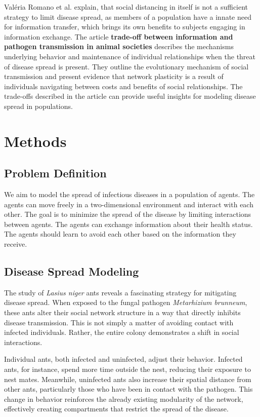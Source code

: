 \documentclass[9pt]{IEEEtran}
\begin{document}
Valéria Romano et al. explain, that social distancing in itself is not a sufficient strategy to limit disease spread, as members of a population have a innate need for information transfer, which brings its own benefits to subjects engaging in information exchange. The article \textbf{trade-off between information and pathogen transmission in animal societies} \cite{romano2022tradeoff} describes the mechanisms underlying behavior and maintenance of individual relationships when the threat of disease spread is present. They outline the evolutionary mechanism of social transmission and present evidence that network plasticity is a result of individuals navigating between costs and benefits of social relationships. The trade-offs described in the article can provide useful insights for modeling disease spread in populations.

\section{Methods}

\subsection{Problem Definition}

We aim to model the spread of infectious diseases in a population of agents. The agents can move freely in a two-dimensional environment and interact with each other. The goal is to minimize the spread of the disease by limiting interactions between agents. The agents can exchange information about their health status. The agents should learn to avoid each other based on the information they receive.

\subsection{Disease Spread Modeling}

The study of \textit{Lasius niger} ants \cite{Stroeymeyt2018} reveals a fascinating strategy for mitigating disease spread. When exposed to the fungal pathogen \textit{Metarhizium brunneum}, these ants alter their social network structure in a way that directly inhibits disease transmission. This is not simply a matter of avoiding contact with infected individuals. Rather, the entire colony demonstrates a shift in social interactions.

Individual ants, both infected and uninfected, adjust their behavior. Infected ants, for instance, spend more time outside the nest, reducing their exposure to nest mates. Meanwhile, uninfected ants also increase their spatial distance from other ants, particularly those who have been in contact with the pathogen. This change in behavior reinforces the already existing modularity of the network, effectively creating compartments that restrict the spread of the disease.
\end{document}
